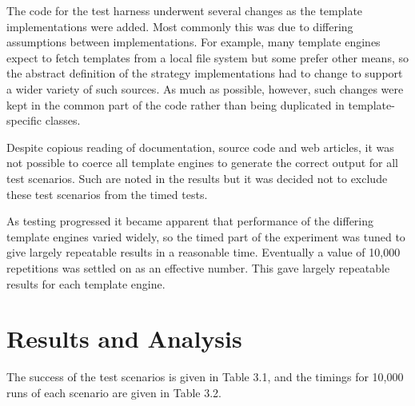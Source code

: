 The code for the test harness underwent several changes as the template implementations were added. Most commonly this was due to differing assumptions between implementations. For example, many template engines expect to fetch templates from a local file system but some prefer other means, so the abstract definition of the strategy implementations had to change to support a wider variety of such sources. As much as possible, however, such changes were kept in the common part of the code rather than being duplicated in template-specific classes.

Despite copious reading of documentation, source code and web articles, it was not possible to coerce all template engines to generate the correct output for all test scenarios. Such  are noted in the results but it was decided not to exclude these test scenarios from the timed tests.

As testing progressed it became apparent that performance of the differing template engines varied widely, so the timed part of the experiment was tuned to give largely repeatable results in a reasonable time. Eventually a value of 10,000 repetitions was settled on as an effective number. This gave largely repeatable results for each template engine.

\section{Results and Analysis}
\label{section:feasibility results}

The success of the test scenarios is given in Table 3.1, and the timings for 10,000 runs of each scenario are given in Table 3.2.

